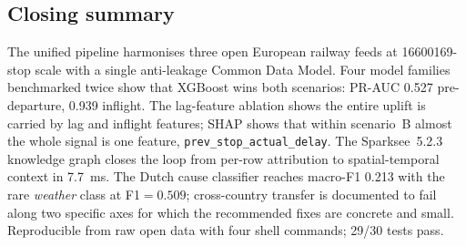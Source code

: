 \subsection{Closing summary}

The unified pipeline harmonises three open European railway feeds at \num{16600169}-stop scale with a single anti-leakage Common Data Model. Four model families benchmarked twice show that XGBoost wins both scenarios: PR-AUC \num{0.527} pre-departure, \num{0.939} inflight. The lag-feature ablation shows the entire uplift is carried by lag and inflight features; SHAP shows that within scenario~B almost the whole signal is one feature, \texttt{prev\_stop\_actual\_delay}. The Sparksee~5.2.3 knowledge graph closes the loop from per-row attribution to spatial-temporal context in \SI{7.7}{ms}. The Dutch cause classifier reaches macro-F1 \num{0.213} with the rare \emph{weather} class at F1$=\num{0.509}$; cross-country transfer is documented to fail along two specific axes for which the recommended fixes are concrete and small. Reproducible from raw open data with four shell commands; 29/30 tests pass.
